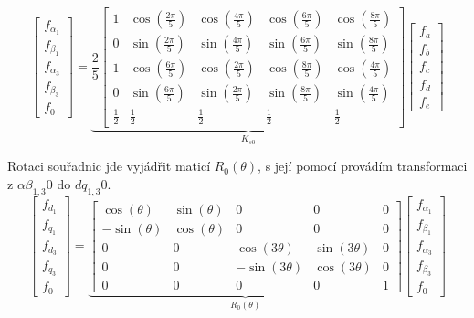 \begin{equation}
    \label{eq:Ks}
    \begin{bmatrix}
        f_{\alpha_1} \\ f_{\beta_1}\\ f_{\alpha_3} \\ f_{\beta_3}\\f_0
    \end{bmatrix}
    = 
    \underbrace{
        \frac{2}{5}
        \begin{bmatrix} 
            1 & \cos(\frac{2\pi}{5}) & \cos(\frac{4\pi}{5}) & \cos(\frac{6\pi}{5}) & \cos(\frac{8\pi}{5}) \\ 
            0 & \sin(\frac{2\pi}{5}) & \sin(\frac{4\pi}{5}) & \sin(\frac{6\pi}{5}) & \sin(\frac{8\pi}{5}) \\ 
            1 & \cos(\frac{6\pi}{5}) & \cos(\frac{2\pi}{5}) & \cos(\frac{8\pi}{5}) & \cos(\frac{4\pi}{5}) \\ 
            0 & \sin(\frac{6\pi}{5}) & \sin(\frac{2\pi}{5}) & \sin(\frac{8\pi}{5}) & \sin(\frac{4\pi}{5}) \\
            \frac{1}{2} & \frac{1}{2} &\frac{1}{2} &\frac{1}{2} &\frac{1}{2} 
        \end{bmatrix}
        }_{K_{s0}}
        \begin{bmatrix}
            f_a\\ f_b \\ f_c \\ f_d\\ f_e
        \end{bmatrix}
    \end{equation}
    
    Rotaci souřadnic jde vyjádřit maticí  $R_0(\theta)$, s její pomocí provádím transformaci z  $\alpha \beta_{1,3}0$ do $dq_{1,3}0$.
    \begin{equation}
        \label{eq:Rmatice}
    \begin{bmatrix}
        f_{d_1} \\ f_{q_1}\\ f_{d_3} \\ f_{q_3}\\f_0
    \end{bmatrix}
    = 
    \underbrace{
        \begin{bmatrix} 
            \cos(\theta) & \sin(\theta) & 0 & 0  & 0\\ 
            -\sin(\theta) & \cos(\theta) & 0 & 0 & 0\\ 
            0 & 0 & \cos(3\theta) & \sin(3\theta) & 0\\ 
            0 & 0 & -\sin(3\theta) & \cos(3\theta) & 0\\
            0 & 0 & 0  & 0  & 1
        \end{bmatrix}
        }_{R_0(\theta)}
        \begin{bmatrix}
            f_{\alpha_1} \\ f_{\beta_1}\\ f_{\alpha_3} \\ f_{\beta_3}\\f_0
        \end{bmatrix}
    \end{equation}
    
